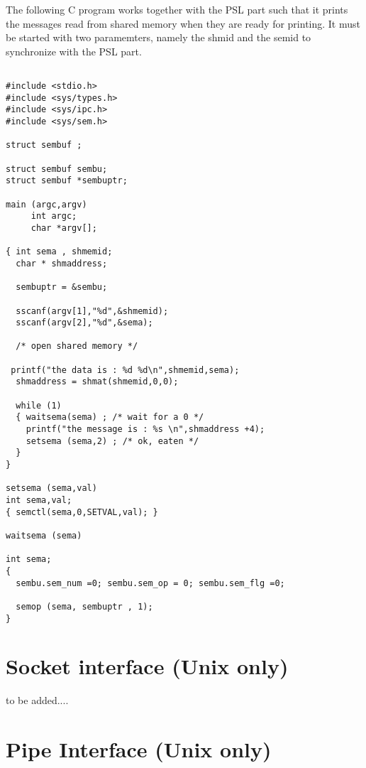 


The following C program works together with the PSL part
such that it prints the messages read from shared memory
when they are ready for printing. It must be started with
two paramemters, namely the shmid and the semid to synchronize
with the PSL part.

\begin{verbatim}

#include <stdio.h>
#include <sys/types.h>
#include <sys/ipc.h>
#include <sys/sem.h>

struct sembuf ;

struct sembuf sembu;
struct sembuf *sembuptr;

main (argc,argv)
     int argc;
     char *argv[];

{ int sema , shmemid;
  char * shmaddress;

  sembuptr = &sembu;

  sscanf(argv[1],"%d",&shmemid);
  sscanf(argv[2],"%d",&sema);

  /* open shared memory */

 printf("the data is : %d %d\n",shmemid,sema);
  shmaddress = shmat(shmemid,0,0);

  while (1)
  { waitsema(sema) ; /* wait for a 0 */
    printf("the message is : %s \n",shmaddress +4);
    setsema (sema,2) ; /* ok, eaten */
  }
}

setsema (sema,val)
int sema,val;
{ semctl(sema,0,SETVAL,val); }

waitsema (sema)

int sema;
{ 
  sembu.sem_num =0; sembu.sem_op = 0; sembu.sem_flg =0;

  semop (sema, sembuptr , 1);
}
\end{verbatim}

\section{Socket interface (Unix only)}

to be added....

\section{Pipe Interface (Unix only)}

